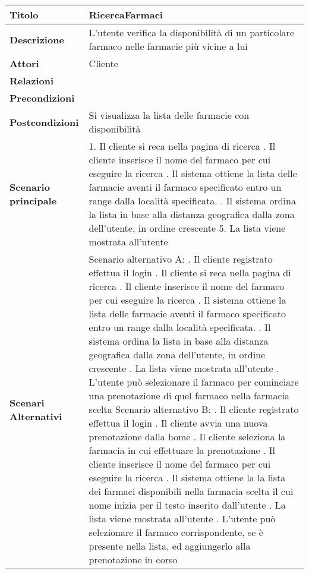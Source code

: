 \begin{tabular} {|P{4.5cm}|P{12.5cm}|}
\hline
  \textbf{Titolo} & RicercaFarmaci\\
\hline
  \textbf{Descrizione} & L'utente verifica la disponibilità di un particolare farmaco nelle farmacie più vicine a lui\\
\hline
  \textbf{Attori} & Cliente\\
\hline
  \textbf{Relazioni} &\\
\hline
  \textbf{Precondizioni} &\\
\hline
  \textbf{Postcondizioni} & Si visualizza la lista delle farmacie con disponibilità\\
\hline
  \textbf{Scenario principale} & 1. Il cliente si reca nella pagina di ricerca . Il cliente inserisce il nome del farmaco per cui eseguire la ricerca . Il sistema ottiene la lista delle farmacie aventi il farmaco specificato entro un range dalla località specificata. . Il sistema ordina la lista in base alla distanza geografica dalla zona dell'utente, in ordine crescente 5. La lista viene mostrata all'utente\\
\hline
  \textbf{Scenari Alternativi} & Scenario alternativo A: . Il cliente registrato effettua il login . Il cliente si reca nella pagina di ricerca . Il cliente inserisce il nome del farmaco per cui eseguire la ricerca . Il sistema ottiene la lista delle farmacie aventi il farmaco specificato entro un range dalla località specificata. . Il sistema ordina la lista in base alla distanza geografica dalla zona dell'utente, in ordine crescente . La lista viene mostrata all'utente . L'utente può selezionare il farmaco per cominciare una prenotazione di quel farmaco nella farmacia scelta \linebreak Scenario alternativo B: . Il cliente registrato effettua il login . Il cliente avvia una nuova prenotazione dalla home . Il cliente seleziona la farmacia in cui effettuare la prenotazione . Il cliente inserisce il nome del farmaco per cui eseguire la ricerca . Il sistema ottiene la la lista dei farmaci disponibili nella farmacia scelta il cui nome inizia per il testo inserito dall'utente . La lista viene mostrata all'utente . L'utente può selezionare il farmaco corrispondente, se è presente nella lista, ed aggiungerlo alla prenotazione in corso\\

\end{tabular}
